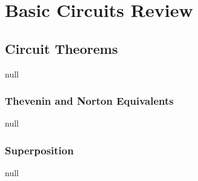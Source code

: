 \chapter{Basic Circuits Review}
\section{Circuit Theorems}
null
\subsection{Thevenin and Norton Equivalents}
null
\subsection{Superposition}
null
